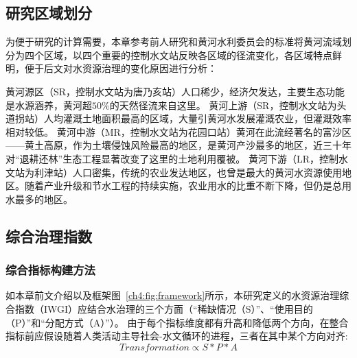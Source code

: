 \subsection{研究区域划分}\label{ch4:sec:region}

为便于研究的计算需要，本章参考前人研究和黄河水利委员会的标准将黄河流域划分为四个区域\cite{shuilibuhuangheshuiliweiyuanhui2010,wang2019c}，以四个重要的控制水文站反映各区域的径流变化，各区域特点鲜明，便于后文对水资源治理的变化原因进行分析：

黄河源区（SR，控制水文站为唐乃亥站）人口稀少，经济欠发达，主要生态功能是水源涵养，黄河超$50\%$的天然径流来自这里。
黄河上游（SR，控制水文站为头道拐站）人均灌溉土地面积最高的区域，大量引黄河水发展灌溉农业，但灌溉效率相对较低。
黄河中游（MR，控制水文站为花园口站）黄河在此流经著名的富沙区——黄土高原，作为土壤侵蚀风险最高的地区，是黄河产沙最多的地区，近三十年对“退耕还林”生态工程显著改变了这里的土地利用覆被。
黄河下游（LR，控制水文站为利津站）人口密集，传统的农业发达地区，也曾是最大的黄河水资源使用地区。随着产业升级和节水工程的持续实施，农业用水的比重不断下降，但仍是总用水最多的地区。



\subsection{综合治理指数}

\subsubsection{综合指标构建方法}

如本章前文介绍以及框架图~\ref{ch4:fig:framework}所示，本研究定义的水资源治理综合指数（IWGI）应结合水治理的三个方面（“稀缺情况（S）”、“使用目的（P）”和“分配方式（A）”）。
由于每个指标维度都有升高和降低两个方向，在整合指标前应假设随着人类活动主导社会-水文循环的进程，三者在其中某个方向对齐:
\begin{equation}
    Transformation \propto S*P*A
\end{equation}

